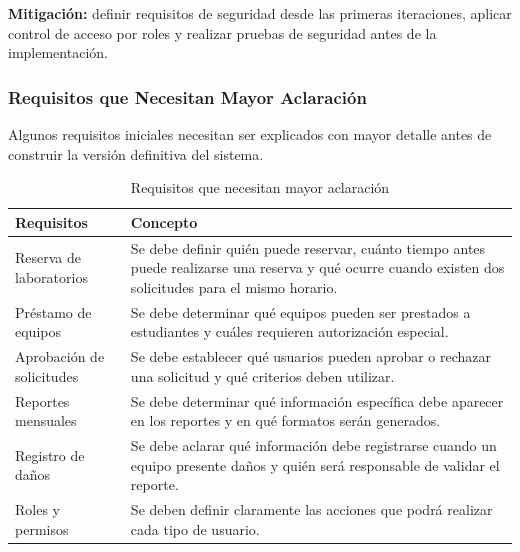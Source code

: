 \documentclass[pdflatex,sn-mathphys-num]{sn-jnl}%
\theoremstyle{thmstyleone}%
\theoremstyle{thmstyletwo}%
\theoremstyle{thmstylethree}%
\begin{document}
 \textbf{Mitigación:} definir requisitos de seguridad desde las primeras iteraciones, aplicar control de acceso por roles y realizar pruebas de seguridad antes de la implementación.
 
 \subsubsection{Requisitos que Necesitan Mayor Aclaración}
 
 Algunos requisitos iniciales necesitan ser explicados con mayor detalle antes de construir la versión definitiva del sistema.
 
 \begin{table}[htbp]
 	\centering
 	\caption{Requisitos que necesitan mayor aclaración}
 	\label{tab:aclaraciones}
 	\begin{tabular}{|p{4cm}|p{9cm}|}
 		\hline
 		\textbf{Requisitos} & \textbf{Concepto} \\ \hline
 		
 		Reserva de laboratorios &
 		Se debe definir quién puede reservar, cuánto tiempo antes puede realizarse una reserva y qué ocurre cuando existen dos solicitudes para el mismo horario. \\ \hline
 		
 		Préstamo de equipos &
 		Se debe determinar qué equipos pueden ser prestados a estudiantes y cuáles requieren autorización especial. \\ \hline
 		
 		Aprobación de solicitudes &
 		Se debe establecer qué usuarios pueden aprobar o rechazar una solicitud y qué criterios deben utilizar. \\ \hline
 		
 		Reportes mensuales &
 		Se debe determinar qué información específica debe aparecer en los reportes y en qué formatos serán generados. \\ \hline
 		
 		Registro de daños &
 		Se debe aclarar qué información debe registrarse cuando un equipo presente daños y quién será responsable de validar el reporte. \\ \hline
 		
 		Roles y permisos &
 		Se deben definir claramente las acciones que podrá realizar cada tipo de usuario. \\ \hline
 		
 	\end{tabular}
 \end{table}
 
\end{document}
